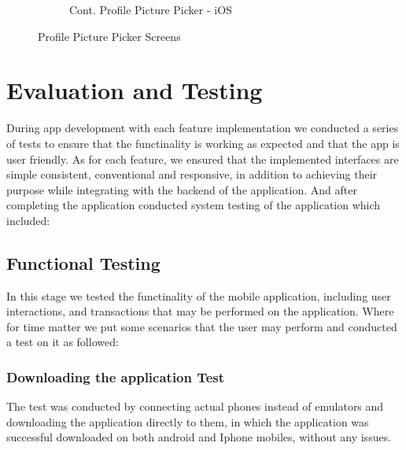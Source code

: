 \documentclass[a4paper, 12pt]{report} %
\begin{document}
\begin{figure}[H]
\begin{subfigure}{0.4\textwidth}
                    \caption{Cont. Profile Picture Picker - iOS}
                    \label{fig:pfp_select_2}
                \end{subfigure}
                \caption{Profile Picture Picker Screens}
                \label{fig:pfp_select}
            \end{figure}

    \pagebreak
    
    \section{Evaluation and Testing}
        During app development with each feature implementation we conducted a series of tests to ensure that the functinality is working as expected and that the app is user friendly. As for each feature, we ensured that the implemented interfaces are simple consistent, conventional and responsive, in addition to achieving their purpose while integrating with the backend of the application.
        And after completing the application conducted system testing of the application which included:
        \subsection{Functional Testing}
            In this stage we tested the functinality of the mobile application, including user interactions, and transactions that may be performed on the application.
            Where for time matter we put some scenarios that the user may perform and conducted a test on it as followed:
            \subsubsection{Downloading the application Test}
                The test was conducted by connecting actual phones instead of emulators and downloading the application directly to them, in which the application was successful downloaded on both android and Iphone mobiles, without any issues.
\end{document}
